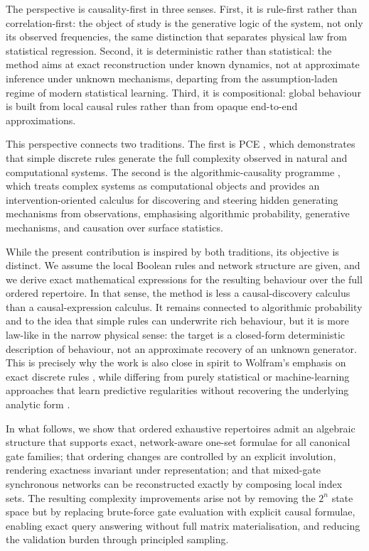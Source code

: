 \documentclass[11pt]{article}
\theoremstyle{definition}
\begin{document}
The perspective is causality-first in three senses. First, it is rule-first rather than correlation-first:
the object of study is the generative logic of the system, not only its observed frequencies, the same
distinction that separates physical law from statistical regression. Second, it is deterministic rather
than statistical: the method aims at exact reconstruction under known dynamics, not at approximate
inference under unknown mechanisms, departing from the assumption-laden regime of modern statistical
learning. Third, it is compositional: global behaviour is built from local causal rules rather than from
opaque end-to-end approximations.

This perspective connects two traditions. The first is PCE \cite{wolfram2002new}, which
demonstrates that simple discrete rules generate the full complexity observed in natural and
computational systems. The second is the algorithmic-causality programme
\cite{zenilcalculus,zenildeconv}, which treats complex systems as computational objects and
provides an intervention-oriented calculus for discovering and steering hidden generating
mechanisms from observations, emphasising algorithmic probability, generative mechanisms, and
causation over surface statistics.

While the present contribution is inspired by both traditions, its objective is distinct. We
assume the local Boolean rules and network structure are given, and we derive exact mathematical
expressions for the resulting behaviour over the full ordered repertoire. In that sense, the method is less
a causal-discovery calculus than a causal-expression calculus. It remains connected to algorithmic
probability and to the idea that simple rules can underwrite rich behaviour, but it is more law-like in the
narrow physical sense: the target is a closed-form deterministic description of behaviour, not an
approximate recovery of an unknown generator. This is precisely why the work is also close in spirit to
Wolfram's emphasis on exact discrete rules \cite{wolfram2002new}, while differing from purely statistical
or machine-learning approaches that learn predictive regularities without recovering the underlying
analytic form \cite{pearl2009causality}.


In what follows, we show that ordered exhaustive repertoires admit an algebraic structure that supports exact, network-aware one-set formulae for all canonical gate families; that ordering changes are controlled by an explicit involution, rendering exactness invariant under representation; and that mixed-gate synchronous networks can be reconstructed exactly by composing local index sets. The resulting complexity improvements arise not by removing the \(2^n\) state space but by replacing brute-force gate evaluation with explicit causal formulae, enabling exact query answering without full matrix materialisation, and reducing the validation burden through principled sampling.
\end{document}
